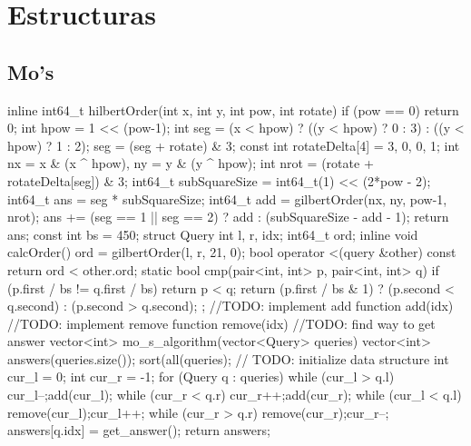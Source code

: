 \documentclass[10pt, landscape, twocolumn, a4paper, notitlepage]{article}
\begin{document}
\section{Estructuras}
\subsection{Mo's}
\begin{code}
inline int64_t hilbertOrder(int x, int y, int pow, int rotate) {
    if (pow == 0) return 0;
    int hpow = 1 << (pow-1);
    int seg = (x < hpow) 
            ? ((y < hpow) ? 0 : 3) 
            : ((y < hpow) ? 1 : 2);
    seg = (seg + rotate) & 3;
    const int rotateDelta[4] = {3, 0, 0, 1};
    int nx = x & (x ^ hpow), ny = y & (y ^ hpow);
    int nrot = (rotate + rotateDelta[seg]) & 3;
    int64_t subSquareSize = int64_t(1) << (2*pow - 2);
    int64_t ans = seg * subSquareSize;
    int64_t add = gilbertOrder(nx, ny, pow-1, nrot);
    ans += (seg == 1 || seg == 2) ? add : (subSquareSize - add - 1);
    return ans;
}
const int bs = 450;
struct Query {
    int l, r, idx;
    int64_t ord;
    inline void calcOrder() {
        ord = gilbertOrder(l, r, 21, 0);
    }
    bool operator <(query &other) const {
        return ord < other.ord;
    }
    static bool cmp(pair<int, int> p, pair<int, int> q) {
        if (p.first / bs != q.first / bs)
            return p < q;
        return (p.first / bs & 1) ? (p.second < q.second) : (p.second > q.second);
    }
};
//TODO: implement add function add(idx)
//TODO: implement remove function remove(idx)
//TODO: find way to get answer
vector<int> mo_s_algorithm(vector<Query> queries) {
    vector<int> answers(queries.size());
    sort(all(queries);
    // TODO: initialize data structure
    int cur_l = 0;
    int cur_r = -1;
    for (Query q : queries) {
        while (cur_l > q.l) {
            cur_l--;add(cur_l);
        }
        while (cur_r < q.r) {
            cur_r++;add(cur_r);
        }
        while (cur_l < q.l) {
            remove(cur_l);cur_l++;
        }
        while (cur_r > q.r) {
            remove(cur_r);cur_r--;
        }
        answers[q.idx] = get_answer();
    }
    return answers;
}
\end{code}
\end{document}
